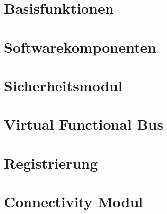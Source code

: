 \newpage
\section{Basisfunktionen}


\section{Softwarekomponenten}





\section{Sicherheitsmodul}


\section{Virtual Functional Bus}


\section{Registrierung}

\newpage
\section{Connectivity Modul} \label{CM}






















